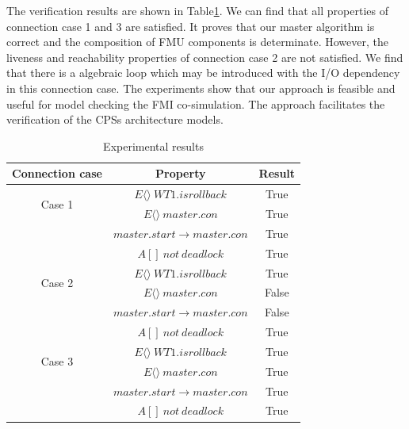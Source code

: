 The verification results are shown in Table\ref{rs}. We can find that all properties of connection case 1 and 3 are satisfied. It proves that our master algorithm is correct and the composition of FMU components is determinate. However, the liveness and reachability properties of connection case 2 are not satisfied. We find that there is a algebraic loop which may be introduced with the I/O dependency in this connection case. The experiments show that our approach is feasible and useful for model checking the FMI co-simulation. The approach facilitates the verification of the CPSs architecture models.
\begin{table}
\caption{Experimental results}
\centering
\begin{tabular}{c c c} 
        \hline  
        Connection case & Property & Result\\
        \hline
        \multirow{2}{2.0cm}{Case 1}  
                & $E\langle\rangle~WT1.isrollback$ & True\\ 
                & $E\langle\rangle~master.con$ & True\\ 
                & $master.start\rightarrow master.con$ & True\\ 
                & $A[]~not~deadlock$ & True\\   
        \hline 
        \multirow{2}{2.0cm}{Case 2}  
                & $E\langle\rangle~WT1.isrollback$ & True\\ 
                & $E\langle\rangle~master.con$ & False\\ 
                & $master.start\rightarrow master.con$ & False\\ 
                & $A[]~not~deadlock$ & True\\   
        \hline 
        \multirow{2}{2.0cm}{Case 3}  
                & $E\langle\rangle~WT1.isrollback$ & True\\ 
                & $E\langle\rangle~master.con$ & True\\ 
                & $master.start \rightarrow master.con$ & True\\ 
                & $A[]~not~deadlock$ & True\\   
        \hline 
\end{tabular} 
\label{rs}
\end{table}





